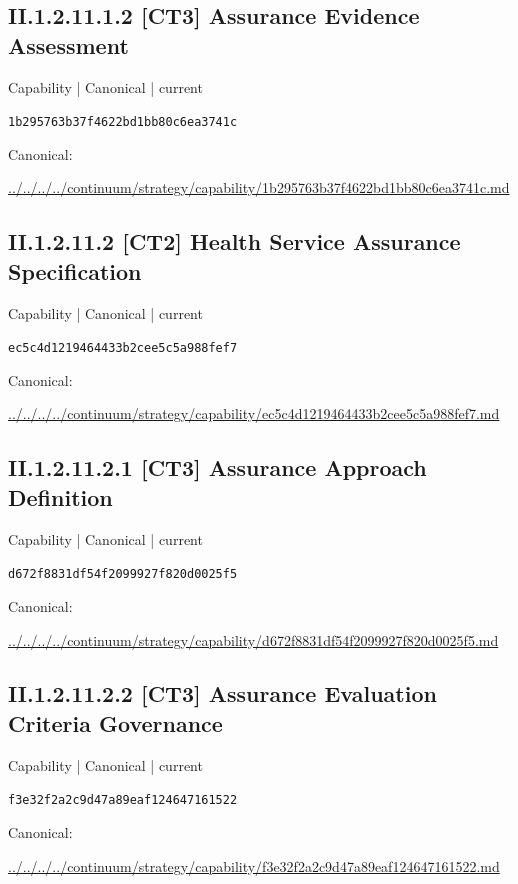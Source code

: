 \documentclass[10pt,a4paper]{article}
\begin{document}
\subsection*{II.1.2.11.1.2 [CT3] Assurance Evidence Assessment}
\label{element-1b295763b37f4622bd1bb80c6ea3741c}
{\small Capability | Canonical | current}\par
\texttt{1b295763b37f4622bd1bb80c6ea3741c}\par
Canonical: \par
{\footnotesize\url{../../../../continuum/strategy/capability/1b295763b37f4622bd1bb80c6ea3741c.md}}\par
\subsection*{II.1.2.11.2 [CT2] Health Service Assurance Specification}
\label{element-ec5c4d1219464433b2cee5c5a988fef7}
{\small Capability | Canonical | current}\par
\texttt{ec5c4d1219464433b2cee5c5a988fef7}\par
Canonical: \par
{\footnotesize\url{../../../../continuum/strategy/capability/ec5c4d1219464433b2cee5c5a988fef7.md}}\par
\subsection*{II.1.2.11.2.1 [CT3] Assurance Approach Definition}
\label{element-d672f8831df54f2099927f820d0025f5}
{\small Capability | Canonical | current}\par
\texttt{d672f8831df54f2099927f820d0025f5}\par
Canonical: \par
{\footnotesize\url{../../../../continuum/strategy/capability/d672f8831df54f2099927f820d0025f5.md}}\par
\subsection*{II.1.2.11.2.2 [CT3] Assurance Evaluation Criteria Governance}
\label{element-f3e32f2a2c9d47a89eaf124647161522}
{\small Capability | Canonical | current}\par
\texttt{f3e32f2a2c9d47a89eaf124647161522}\par
Canonical: \par
{\footnotesize\url{../../../../continuum/strategy/capability/f3e32f2a2c9d47a89eaf124647161522.md}}\par
\end{document}
